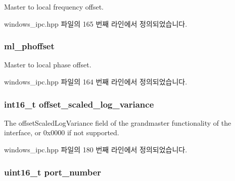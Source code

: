 Master to local frequency offset. 



windows\+\_\+ipc.\+hpp 파일의 165 번째 라인에서 정의되었습니다.

\subsubsection[{\texorpdfstring{ml\+\_\+phoffset}{ml_phoffset}}]{ ml\+\_\+phoffset\hspace{0.3cm}{\ttfamily [inherited]}}\hypertarget{class_offset_a707b32410dd96584191405fcc6b1b10d}{}\label{class_offset_a707b32410dd96584191405fcc6b1b10d}


Master to local phase offset. 



windows\+\_\+ipc.\+hpp 파일의 164 번째 라인에서 정의되었습니다.

\subsubsection[{\texorpdfstring{offset\+\_\+scaled\+\_\+log\+\_\+variance}{offset_scaled_log_variance}}]{\setlength{\rightskip}{0pt plus 5cm}int16\+\_\+t offset\+\_\+scaled\+\_\+log\+\_\+variance\hspace{0.3cm}{\ttfamily [inherited]}}\hypertarget{class_offset_a022841cfc4d83dc906f116eec53f1d9a}{}\label{class_offset_a022841cfc4d83dc906f116eec53f1d9a}


The offset\+Scaled\+Log\+Variance field of the grandmaster functionality of the interface, or 0x0000 if not supported. 



windows\+\_\+ipc.\+hpp 파일의 180 번째 라인에서 정의되었습니다.

\subsubsection[{\texorpdfstring{port\+\_\+number}{port_number}}]{\setlength{\rightskip}{0pt plus 5cm}uint16\+\_\+t port\+\_\+number\hspace{0.3cm}{\ttfamily [inherited]}}\hypertarget{class_offset_af0afa7bb85d49ac5ff873fad86a48ec5}{}\label{class_offset_af0afa7bb85d49ac5ff873fad86a48ec5}


